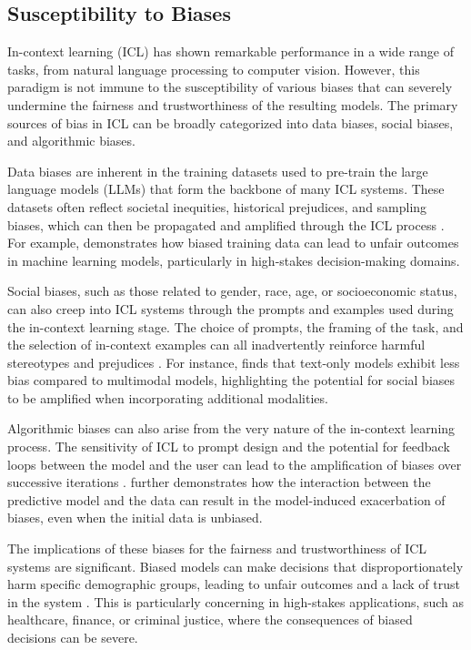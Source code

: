 \documentclass[11pt]{article}
\begin{document}
\subsection{Susceptibility to Biases}

In-context learning (ICL) has shown remarkable performance in a wide range of tasks, from natural language processing to computer vision. However, this paradigm is not immune to the susceptibility of various biases that can severely undermine the fairness and trustworthiness of the resulting models. The primary sources of bias in ICL can be broadly categorized into data biases, social biases, and algorithmic biases.

Data biases are inherent in the training datasets used to pre-train the large language models (LLMs) that form the backbone of many ICL systems. These datasets often reflect societal inequities, historical prejudices, and sampling biases, which can then be propagated and amplified through the ICL process \cite{ref53}. For example, \cite{ref320,ref321} demonstrates how biased training data can lead to unfair outcomes in machine learning models, particularly in high-stakes decision-making domains.

Social biases, such as those related to gender, race, age, or socioeconomic status, can also creep into ICL systems through the prompts and examples used during the in-context learning stage. The choice of prompts, the framing of the task, and the selection of in-context examples can all inadvertently reinforce harmful stereotypes and prejudices \cite{ref322}. For instance, \cite{ref323} finds that text-only models exhibit less bias compared to multimodal models, highlighting the potential for social biases to be amplified when incorporating additional modalities.

Algorithmic biases can also arise from the very nature of the in-context learning process. The sensitivity of ICL to prompt design and the potential for feedback loops between the model and the user can lead to the amplification of biases over successive iterations \cite{ref324}. \cite{ref325} further demonstrates how the interaction between the predictive model and the data can result in the model-induced exacerbation of biases, even when the initial data is unbiased.

The implications of these biases for the fairness and trustworthiness of ICL systems are significant. Biased models can make decisions that disproportionately harm specific demographic groups, leading to unfair outcomes and a lack of trust in the system \cite{ref326}. This is particularly concerning in high-stakes applications, such as healthcare, finance, or criminal justice, where the consequences of biased decisions can be severe.
\end{document}
